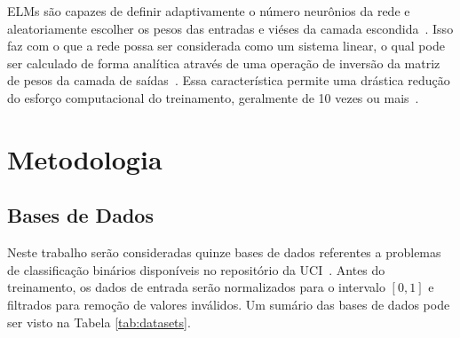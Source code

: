 \documentclass[conference]{IEEEtran}
\begin{document}
	ELMs são capazes de definir adaptivamente o número neurônios da rede e aleatoriamente escolher os pesos das entradas e viéses da camada escondida~\cite{huang2006extreme}. Isso faz com o que a rede possa ser considerada como um sistema linear, o qual pode ser calculado de forma analítica através de uma operação de inversão da matriz de pesos da camada de saídas~\cite{huang2006extreme}. Essa característica permite uma drástica redução do esforço computacional do treinamento, geralmente de 10 vezes ou mais~\cite{deng2010research}. 
	
	\section{Metodologia}
	\subsection{Bases de Dados}
	Neste trabalho serão consideradas quinze bases de dados referentes a problemas de classificação binários disponíveis no repositório da UCI~\cite{dua2019}. Antes do treinamento, os dados de entrada serão normalizados para o intervalo $[0,1]$ e filtrados para remoção de valores inválidos. Um sumário das bases de dados pode ser visto na Tabela \ref{tab:datasets}.
\end{document}
